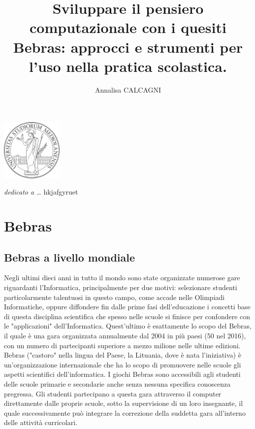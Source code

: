 \documentclass[12pt]{report}
\begin{document}
\begin{center}
	\includegraphics[height=3.0cm]{logo_unimi.png}
\end{center}

\title{Sviluppare il pensiero computazionale con i quesiti Bebras: approcci e strumenti per l'uso nella pratica scolastica.}
\author{Annalisa CALCAGNI}
%
% 
%
\beforepreface
        {\hfill \Large {\sl dedicato a \dots}}
% 
\afterpreface
%
hkjafgyruet
%
%
%
% 
% 
\chapter{Bebras}
\label{cap1}
%
\section{Bebras a livello mondiale}
Negli ultimi dieci anni in tutto il mondo sono state organizzate numerose gare riguardanti l'Informatica, principalmente per due motivi: selezionare studenti particolarmente talentuosi in questo campo, come accade nelle Olimpiadi Informatiche, oppure diffondere fin dalle prime fasi dell'educazione i concetti base di questa disciplina scientifica che spesso nelle scuole si finisce per confondere con le "applicazioni" dell'Informatica. Quest'ultimo è esattamente lo scopo del Bebras, il quale è una gara organizzata annualmente dal 2004 in più paesi (50 nel 2016), con un numero di partecipanti superiore a mezzo milione nelle ultime edizioni.\cite{BellettiniITICSE2015}
Bebras ("castoro" nella lingua del Paese, la Lituania, dove è nata l'iniziativa) è un'organizzazione internazionale che ha lo scopo di promuovere nelle scuole gli aspetti scientifici dell'informatica. I giochi Bebras sono accessibili agli studenti delle scuole primarie e secondarie anche senza nessuna specifica conoscenza pregressa. Gli studenti partecipano a questa gara attraverso il computer direttamente dalle proprie scuole, sotto la supervisione di un loro insegnante, il quale successivamente può integrare la correzione della suddetta gara all'interno delle attività curricolari.
\end{document}
